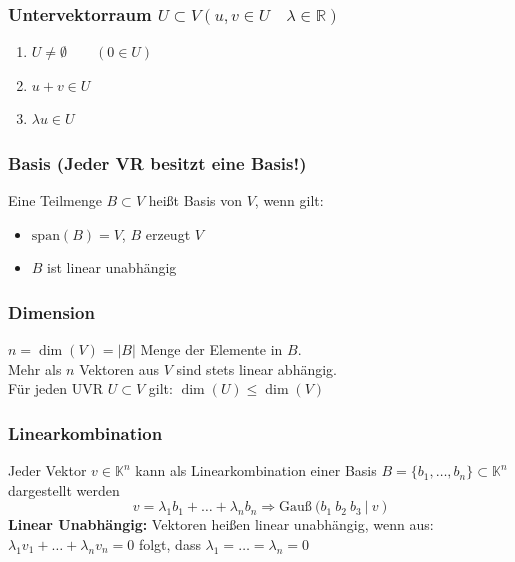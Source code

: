 \documentclass[6pt,a4paper]{scrartcl}
\newcommand{\abs}[1]{\ensuremath{\left\vert#1\right\vert}}
\begin{document}
\begin{multicols*}{4}
\subsubsection{Untervektorraum $U\subset V (u,v\in U \quad \lambda\in\mathbb{R})$}
\begin{enumerate}\itemsep0pt
\item $U\ne \emptyset \qquad (0\in U)$
\item $u+v\in U$
\item $\lambda u \in U$
\end{enumerate}

\subsubsection{Basis (Jeder VR besitzt eine Basis!)} %
\label{sub:basis}
 Eine Teilmenge $B\subset V$ heißt Basis von $V$, wenn gilt:
\begin{itemize}\itemsep0pt
	\item $\mathrm{span}(B) =V$, $B$ erzeugt $V$
	\item $B$ ist linear unabhängig
\end{itemize}    

\subsubsection{Dimension}
$n=\dim(V)=\abs{B}$ Menge der Elemente in $B$.\\
Mehr als $n$ Vektoren aus $V$ sind stets linear abhängig. \\
Für jeden UVR $U \subset V$ gilt: $\dim (U) \le \dim (V)$ 

\subsubsection{Linearkombination}
Jeder Vektor $v\in\mathbb{K}^n$ kann als Linearkombination einer Basis $B=\{b_1, \dots, b_n\} \subset \mathbb{K}^n$ dargestellt werden
\begin{equation*}
v=\lambda_1 b_1 + \dots + \lambda_n b_n \Rightarrow \text{Gauß} \ \Big(b_1 \ b_2 \ b_3 \ |\ v\ \Big)
\end{equation*}
\textbf{Linear Unabhängig:}
Vektoren heißen linear unabhängig, wenn aus: \\
$\lambda_1 v_1 + \dots + \lambda_n v_n = 0$ folgt, dass $\lambda_1 = \dots = \lambda_n = 0$


\end{multicols*}
\end{document}
